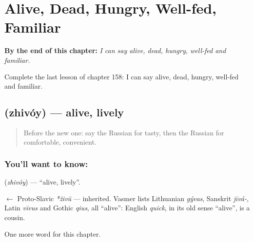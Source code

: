 
\chapter{Alive, Dead, Hungry, Well-fed, Familiar}
\label{ch:ru-alive-dead-hungry-well-fed-familiar}

\begin{chapteropening}
\textbf{By the end of this chapter:} \emph{I can say alive, dead, hungry, well-fed and familiar.}

Complete the last lesson of chapter 158: I can say alive, dead, hungry, well-fed and familiar.
\end{chapteropening}

\section[\texorpdfstring{\ru{живой} (zhivóy)}{живой (zhivóy)}]{ (zhivóy) — alive, lively}

\label{lesson:RU-C158-zhivoy}



\begin{quote}
Before the new one: say the Russian for tasty, then the Russian for comfortable, convenient.
\end{quote}

\subsection*{You'll want to know: }
\textbf{} (\emph{zhivóy}) — \textquotedblleft{}alive, lively\textquotedblright{}.

\begin{cousinweb}
\textbf{} $\leftarrow$ Proto-Slavic \emph{*živŭ} — inherited. Vasmer lists Lithuanian \emph{gývas}, Sanskrit \emph{jīvá-}, Latin \emph{vīvus} and Gothic \emph{qius}, all \textquotedblleft{}alive\textquotedblright{}: English \emph{quick}, in its old sense \textquotedblleft{}alive\textquotedblright{}, is a cousin.
\end{cousinweb}

\begin{grammarlens}[title={What you've built}]
One more word for this chapter.
\end{grammarlens}

